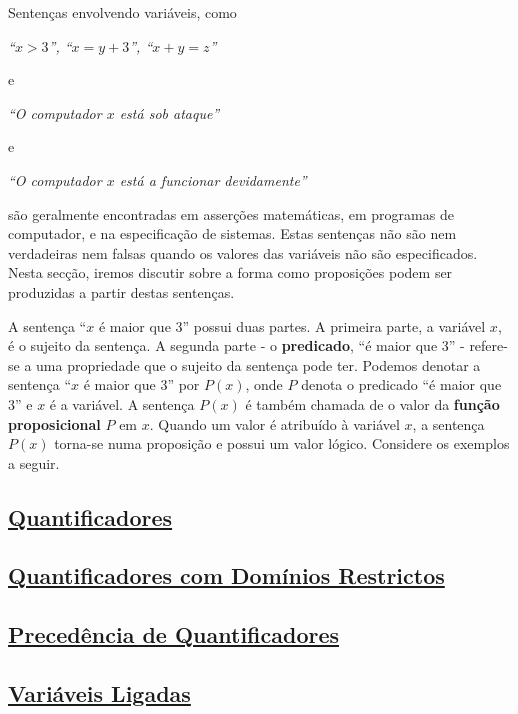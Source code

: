 Sentenças envolvendo variáveis, como

\begin{center}\emph{``$x > 3$'', ``$x = y + 3$'', ``$x + y = z$''}\end{center}

e

\begin{center}\emph{``O computador $x$ está sob ataque''}\end{center}

e

\begin{center}\emph{``O computador $x$ está a funcionar devidamente''}\end{center}

são geralmente encontradas em asserções matemáticas, em programas de computador,
e na especificação de sistemas. Estas sentenças não são nem verdadeiras nem
falsas quando os valores das variáveis não são especificados. Nesta secção,
iremos discutir sobre a forma como proposições podem ser produzidas a partir
destas sentenças.

A sentença ``$x$ é maior que 3'' possui duas partes. A primeira parte, a
variável $x$, é o sujeito da sentença. A segunda parte - o \textbf{predicado},
``é maior que 3'' - refere-se a uma propriedade que o sujeito da sentença pode
ter. Podemos denotar a sentença ``$x$ é maior que 3'' por $P(x)$, onde $P$
denota o predicado ``é maior que 3'' e $x$ é a variável. A sentença $P(x)$ é
também chamada de o valor da \textbf{função proposicional} $P$ em $x$. Quando um
valor é atribuído à variável $x$, a sentença $P(x)$ torna-se numa proposição e
possui um valor lógico. Considere os exemplos a seguir.
 
\subsection*{\underline{Quantificadores}}
\subsection*{\underline{Quantificadores com Domínios Restrictos}}
\subsection*{\underline{Precedência de Quantificadores}}
\subsection*{\underline{Variáveis Ligadas}}
